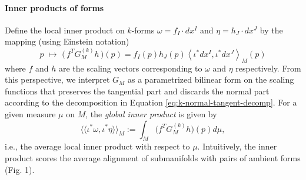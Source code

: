 \documentclass{article}
\theoremstyle{remark}
\theoremstyle{plain}
\begin{document}
\paragraph{Inner products of forms} Define the local inner product on $k$-forms $\omega = f_I \cdot dx^I$ and $\eta = h_J \cdot dx^J$ by the mapping (using Einstein notation)
\begin{equation}
    p \, \, \mapsto \, \,  \Big(\, f^T G_M^{(k)} h\, \Big)(p) =  f_I(p) h_J(p)\left\langle \iota^* dx^I,\iota^* dx^J \right\rangle_{M}(p) 
\label{eqn:main-local-inner-product}
\end{equation} where $f$ and $h$ are the scaling vectors corresponding to $\omega$ and $\eta$ respectively. From this perspective, we interpret $G_M$ as a parametrized bilinear form on the scaling functions that preserves the tangential part and discards the normal part according to the decomposition in Equation \ref{eq:k-normal-tangent-decomp}. For a given measure $\mu$ on $M$, the \textit{global inner product} is given by
\begin{equation}
    \langle\!\langle \iota^* \omega, \iota^* \eta \rangle\!\rangle_M := \int_M \Big(f^T G_M^{(k)}h\Big)(p) d\mu,
\end{equation} i.e., the average local inner product with respect to $\mu$. Intuitively, the inner product scores the average alignment of submanifolds with pairs of ambient forms (Fig. 1).
\end{document}
